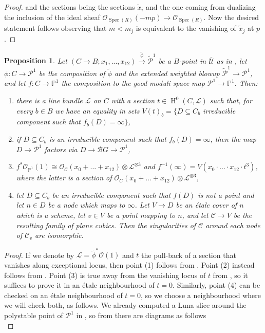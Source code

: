 \documentclass{amsart}
\newcommand{\bP}{\mathbb{P}}
\newcommand{\oH}{\operatorname{H}}
\newcommand{\sP}{\mathscr{P}}
\newcommand{\cB}{\mathcal{B}}
\newcommand{\cC}{\mathcal{C}}
\newcommand{\cL}{\mathcal{L}}
\newcommand{\cO}{\mathcal{O}}
\newcommand{\cU}{\mathcal{U}}
\newcommand{\spec}{\operatorname{Spec}}
\newtheorem{Prop}[theorem]{Proposition}
\theoremstyle{definition}
\theoremstyle{definition}
\begin{document}
{\begin{proof}
    and the sections being the sections $\widetilde{x}_i$ and the one coming from dualizing the inclusion of the ideal sheaf $\cO_{\spec(R)}(-mp)\to \cO_{\spec(R)}$. Now the desired statement follows observing that $m<m_j$ is equivalent to the vanishing of $\widetilde{x}_j$ at $p$.
\end{proof}
\begin{Prop}\label{prop_conditions_induced_by_phi_tilda_on_phi_and_f}
    Let $(C\to B;x_1,...,x_{12})\xrightarrow{\widetilde{\phi}}\widetilde{\sP}^1$ be a $B$-point in $\overline{\cU}$ as in , let $\phi:C\to \sP^1$ be the composition of $\widetilde{\phi}$ and the extended weighted blowup $\widetilde{\sP}^1\to \sP^1$, and let $f:C\to \bP^1$ the composition to the good moduli space map $\sP^1\to \bP^1$. Then:
    \begin{enumerate}
        \item there is a line bundle $\cL$ on $C$ with a section $t\in \oH^0(C,\cL)$ such that, for every $b\in B$ we have an equality in sets $V(t)_b = \{D\subseteq C_b$ irreducible component such that $f_b(D)=\infty\}$,
        \item if $D\subseteq C_b$ is an irreducible component such that $f_b(D)=\infty$, then the map $D\to \sP^1$ factors via $D\to \cB G\to \sP^1$,
        \item $f^*\cO_{\bP^1}(1)\cong \cO_\cC(x_0+ \ldots+ x_{12})\otimes \cL^{\otimes 3}$ and $f^{-1}(\infty)=V(x_0\cdot \ldots\cdot x_{12}\cdot t^3)$, where the latter is a section of $\cO_C(x_0+ \ldots+ x_{12})\otimes \cL^{\otimes 3}$,
        \item let $D\subseteq C_b$ be an irreducible component such that $f(D)$ is not a point and let $n\in D$ be a node which maps to $\infty$. Let $V\to D$ be an \'etale cover of $n$ which is a scheme, let $v\in V$ be a point mapping to $n$, and let $\cC\to V$ be the resulting family of plane cubics. Then the singularities of $\cC$ around each node of $\cC_v$ are isomorphic.
    \end{enumerate}
\end{Prop}
\begin{proof}
    If we denote by $\cL=\widetilde{\phi}^*\cO(1)$ and $t$ the pull-back of a section that vanishes along exceptional locus, then point (1) follows from . Point (2) instead follows from . Point (3) is true away from the vanishing locus of $t$ from , so it suffices to prove it in an \'etale neighbourhood of $t=0$. Similarly, point (4) can be checked on an \'etale neighbourhood of $t=0$, so we choose a neighbourhood where we will check both, as follows. We already computed a Luna slice around the polystable point of $\sP^1$ in ,  so from  there are diagrams as follows  \[
\]
\end{proof}}
\end{document}

